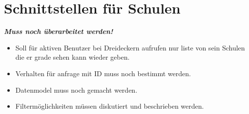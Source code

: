 \section{Schnittstellen für Schulen}
\textbf{\emph{\textcolor[rgb]{1,0,0}{Muss noch überarbeitet werden!}}}
\begin{itemize}
	\item Soll für aktiven Benutzer bei Dreideckern aufrufen nur liste von sein Schulen die er grade sehen kann wieder geben.
	\item Verhalten für anfrage mit ID muss noch bestimmt werden.
	\item Datenmodel muss noch gemacht werden.
	\item Filtermöglichkeiten müssen diskutiert und beschrieben werden.
\end{itemize}

%
%
%
%
%